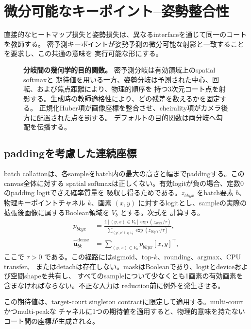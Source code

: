 \section{微分可能なキーポイント--姿勢整合性}
\label{sec:consistency}

直接的なヒートマップ損失と姿勢損失は、異なるinterfaceを通じて同一のコートを教師する。
密予測キーポイントが姿勢予測の微分可能な射影と一致することを要求し、この共通の意味を
実行可能な形にする。

\begin{figure}[t]
  \centering
  \resizebox{\linewidth}{!}{}
  \caption{\textbf{分岐間の幾何学的目的関数。}  密予測分岐は有効領域上のspatial softmaxと
  期待値を用いる一方、姿勢分岐は予測された中心、回転、および焦点距離により、物理的順序を
  持つ3次元コート点を射影する。生成時の教師適格性により、どの残差を数えるかを固定する。
  正規化Huber項が画像座標を整合させ、cheirality項がカメラ後方に配置された点を罰する。
  デフォルトの目的関数は両分岐へ勾配を伝播する。}
  \label{fig:consistency}
\end{figure}

\subsection{paddingを考慮した連続座標}

batch collationは、各sampleをbatch内の最大の高さと幅までpaddingする。このcanvas全体に対する
spatial softmaxは正しくない。有効logitが負の場合、定数0のpadding logitでさえ確率質量を
吸収し得るためである。\(z_{bkyx}\) をbatch要素 \(b\)、物理キーポイントチャネル \(k\)、画素
\((x,y)\) に対するlogitとし、sampleの実際の拡張後画像に属するBoolean領域を \(V_b\) とする。次式を
計算する。
\begin{align}
  p_{bkyx}
    &=\frac{\mathbb{1}[(y,x)\in V_b]\exp(z_{bkyx}/\tau)}
      {\sum_{(y',x')\in V_b}\exp(z_{bky'x'}/\tau)}, \\
  \widehat{\mathbf{u}}^{\mathrm{dense}}_{bk}
    &=\sum_{(y,x)\in V_b}p_{bkyx}[x,y]^{\top},
  \label{eq:masked_expectation}
\end{align}
ここで \(\tau>0\) である。この経路にはsigmoid、top-\(k\)、rounding、argmax、CPU transfer、
またはdetachは存在しない。maskはBooleanであり、logitとdeviceおよび空間shapeを共有し、
すべてのsampleについて少なくとも1画素の有効画素を含まなければならない。不正な入力は
reduction前に例外を発生させる。

この期待値は、target-court singleton \KP contractに限定して適用する。multi-courtかつmulti-peakな
チャネルに1つの期待値を適用すると、物理的意味を持たないコート間の座標が生成される。

